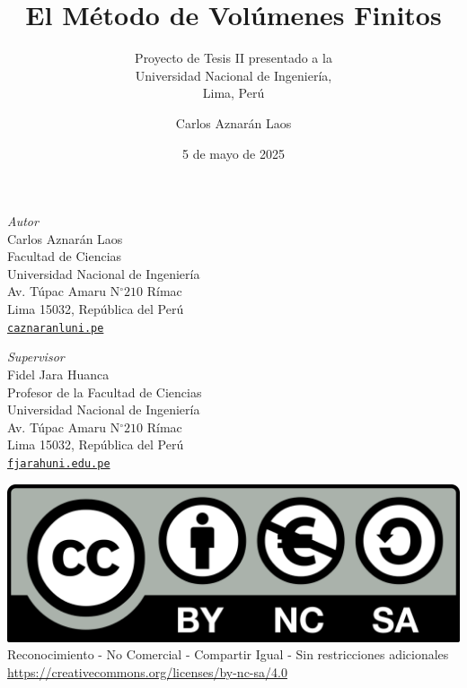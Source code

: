 \documentclass[graybox,envcountchap,sectrefs,a4paper,intlimits]{svmono}
\date{5 de mayo de 2025}
\makeatletter
\newcommand{\MVAt}{{\usefont{U}{mvs}{m}{n}\symbol{`@}}}
\makeatother
\begin{document}
\author{Carlos Aznarán Laos}
\title{El Método de Volúmenes Finitos}
\subtitle{Proyecto de Tesis II presentado a la \\
    Universidad Nacional de Ingeniería, \\
    Lima, Perú}
\maketitle

\clearpage
\thispagestyle{empty}

\begin{minipage}[t]{0.5\textwidth}
    \textit{Autor} \\
    Carlos Aznarán Laos~\href{https://orcid.org/0000-0001-8314-2271}{\textcolor{orcidcolor}{\aiOrcid}} \\
    Facultad de Ciencias \\
    Universidad Nacional de Ingeniería \\
    Av. Túpac Amaru N$^{\circ}210$ Rímac \\
    Lima 15032, República del Perú \\
    \textcolor{black}{}
    \href{mailto:caznaranl@uni.pe}{\texttt{caznaranl\MVAt uni.pe}}
\end{minipage}\hfill
\begin{minipage}[t]{0.5\textwidth}
    \textit{Supervisor} \\
    Fidel Jara Huanca~\href{https://orcid.org/0009-0000-1884-1949}{\textcolor{orcidcolor}{\aiOrcid}} \\
    Profesor de la Facultad de Ciencias \\
    Universidad Nacional de Ingeniería \\
    Av. Túpac Amaru N$^{\circ}210$ Rímac \\
    Lima 15032, República del Perú \\
    \textcolor{black}{}
    \href{mailto:fjarah@uni.edu.pe}{\texttt{fjarah\MVAt uni.edu.pe}}
\end{minipage}

\vfill



\noindent
\includegraphics[width=.25\textwidth]{CC-BY-NC-SA-4.0} \\
Reconocimiento - No Comercial - Compartir Igual - Sin restricciones adicionales \\
\url{https://creativecommons.org/licenses/by-nc-sa/4.0} \\
\end{document}
